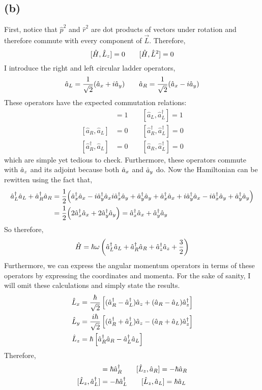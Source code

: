 \documentclass[12pt]{extarticle}
\begin{document}
\subsection*{(b)}
First, notice that $\hat{p}^2$ and $\hat{r}^2$ are dot products of vectors under rotation and therefore commute with every component of $\vec{L}$. Therefore, 
\[ [\hat{H}, \hat{L}_z] = 0 \quad \quad [\hat{H}, \hat{L}^2] =0 \]
I introduce the right and left circular ladder operators, 
\[\hat{a}_L = \frac{1}{\sqrt{2}} (\hat{a}_x + i \hat{a}_y) \quad \quad \hat{a}_R = \frac{1}{\sqrt{2}} (\hat{a}_x - i \hat{a}_y)\]
These operators have the expected commutation relations: 
\begin{align*}
[\hat{a}_R, \hat{a}^\dagger_R] &= 1 \quad \quad
[\hat{a}_L, \hat{a}^\dagger_L] = 1 \\
[\hat{a}_R, \hat{a}_L] &= 0 \quad \quad
[\hat{a}_R^\dagger, \hat{a}^\dagger_L] = 0 \\
[\hat{a}^\dagger_R, \hat{a}_L] &= 0 \quad \quad
[\hat{a}_R, \hat{a}^\dagger_L] = 0 
\end{align*}
which are simple yet tedious to check. 
Furthermore, these operators commute with $\hat{a}_z$ and its adjoint because both $\hat{a}_x$ and $\hat{a}_y$ do. Now the Hamiltonian can be rewitten using the fact that,
\begin{align*}
\hat{a}^\dagger_L \hat{a}_L + \hat{a}^\dagger_R \hat{a}_R & = \frac{1}{2} \Big( \hat{a}^\dagger_x \hat{a}_x - i \hat{a}^\dagger_y \hat{a}_x i \hat{a}^\dagger_x \hat{a}_y + \hat{a}^\dagger_y \hat{a}_y + \hat{a}^\dagger_x \hat{a}_x + i \hat{a}^\dagger_y \hat{a}_x - i \hat{a}^\dagger_x \hat{a}_y + \hat{a}^\dagger_y \hat{a}_y \Big) \\ & = \frac{1}{2} \Big(2 \hat{a}^\dagger_x \hat{a}_x + 2 \hat{a}^\dagger_y \hat{a}_y \Big) = \hat{a}^\dagger_x \hat{a}_x + \hat{a}^\dagger_y \hat{a}_y
\end{align*}
So therefore, 
\[\hat{H} = \hbar \omega \left(\hat{a}^\dagger_L \hat{a}_L + \hat{a}^\dagger_R \hat{a}_R + \hat{a}^\dagger_z \hat{a}_z + \frac{3}{2} \right)\]
Furthermore, we can express the angular momentum operators in terms of these operators by expressing the coordinates and momenta. For the sake of sanity, I will omit these calculations and simply state the results. 
\begin{align*}
\hat{L}_x & = \frac{\hbar}{\sqrt{2}} \left[ (\hat{a}^\dagger_R - \hat{a}^\dagger_L) \hat{a}_z + (\hat{a}_R - \hat{a}_L) \hat{a}^\dagger_z \right] \\
\hat{L}_y & = \frac{i \hbar}{\sqrt{2}} \left[ (\hat{a}^\dagger_R + \hat{a}^\dagger_L) \hat{a}_z - (\hat{a}_R + \hat{a}_L) \hat{a}^\dagger_z \right] \\
\hat{L}_z & = \hbar \left[ \hat{a}^\dagger_R \hat{a}_R - \hat{a}^\dagger_L \hat{a}_L \right] 
\end{align*}
Therefore, 
\begin{align*}
[\L_z, \adag_R] & = \hbar \adag_R \quad \quad [\L_z, \a_R] = - \hbar \a_R \\
[\L_z, \adag_L] & =  - \hbar \adag_L \quad \quad [\L_z, \a_L] = \hbar \a_L
\end{align*} 
\end{document}
